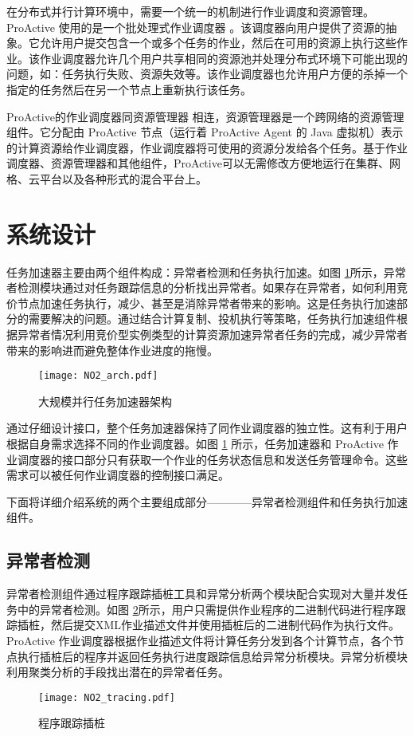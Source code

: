 在分布式并行计算环境中，需要一个统一的机制进行作业调度和资源管理。ProActive 使用的是一个批处理式作业调度器 \cite{pascheduling}。该调度器向用户提供了资源的抽象。它允许用户提交包含一个或多个任务的作业，然后在可用的资源上执行这些作业。该作业调度器允许几个用户共享相同的资源池并处理分布式环境下可能出现的问题，如：任务执行失败、资源失效等。该作业调度器也允许用户方便的杀掉一个指定的任务然后在另一个节点上重新执行该任务。

ProActive的作业调度器同资源管理器 \cite{parm} 相连，资源管理器是一个跨网络的资源管理组件。它分配由 ProActive 节点（运行着 ProActive Agent 的 Java 虚拟机）表示的计算资源给作业调度器，作业调度器将可使用的资源分发给各个任务。基于作业调度器、资源管理器和其他组件，ProActive可以无需修改方便地运行在集群、网格、云平台以及各种形式的混合平台上。

\section{系统设计}
\label{sec:no2}
任务加速器主要由两个组件构成：异常者检测和任务执行加速。如图 \ref{figure:no2arch}所示，异常者检测模块通过对任务跟踪信息的分析找出异常者。如果存在异常者，如何利用竞价节点加速任务执行，减少、甚至是消除异常者带来的影响。这是任务执行加速部分的需要解决的问题。通过结合计算复制、投机执行等策略，任务执行加速组件根据异常者情况利用竞价型实例类型的计算资源加速异常者任务的完成，减少异常者带来的影响进而避免整体作业进度的拖慢。
\begin{figure}
  \centering
  \texttt{[image: NO2\_arch.pdf]}
  \caption{大规模并行任务加速器架构}
  \label{figure:no2arch}
\end{figure}

通过仔细设计接口，整个任务加速器保持了同作业调度器的独立性。这有利于用户根据自身需求选择不同的作业调度器。如图 \ref{figure:no2arch} 所示，任务加速器和 ProActive 作业调度器的接口部分只有获取一个作业的任务状态信息和发送任务管理命令。这些需求可以被任何作业调度器的控制接口满足。

下面将详细介绍系统的两个主要组成部分————异常者检测组件和任务执行加速组件。

\subsection{异常者检测}
\label{subsec:no2_trace}
异常者检测组件通过程序跟踪插桩工具和异常分析两个模块配合实现对大量并发任务中的异常者检测。如图 \ref{figure:tracing}所示，用户只需提供作业程序的二进制代码进行程序跟踪插桩，然后提交XML作业描述文件并使用插桩后的二进制代码作为执行文件。ProActive 作业调度器根据作业描述文件将计算任务分发到各个计算节点，各个节点执行插桩后的程序并返回任务执行进度跟踪信息给异常分析模块。异常分析模块利用聚类分析的手段找出潜在的异常者任务。
\begin{figure}
  \centering
  \texttt{[image: NO2\_tracing.pdf]}
  \caption{程序跟踪插桩}
  \label{figure:tracing}
\end{figure}

